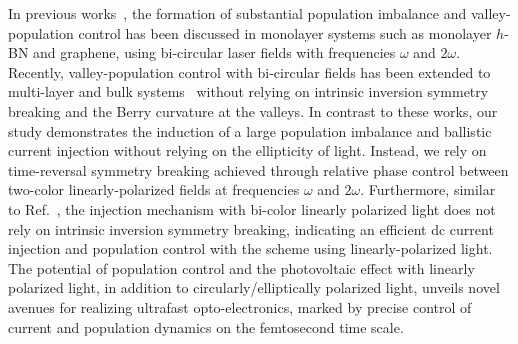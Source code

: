In previous works~\cite{PhysRevLett.127.126601, sato2019microscopic}, the formation of substantial population imbalance and valley-population control has been discussed in monolayer systems such as monolayer $h$-BN and graphene, using bi-circular laser fields with frequencies $\omega$ and $2\omega$. Recently, valley-population control with bi-circular fields has been extended to multi-layer and bulk systems~\cite{tyulnev2023valleytronics} without relying on intrinsic inversion symmetry breaking and the Berry curvature at the valleys. In contrast to these works, our study demonstrates the induction of a large population imbalance and ballistic current injection without relying on the ellipticity of light. Instead, we rely on time-reversal symmetry breaking achieved through relative phase control between two-color linearly-polarized fields at frequencies $\omega$ and $2\omega$. Furthermore, similar to Ref.~\cite{tyulnev2023valleytronics}, the injection mechanism with bi-color linearly polarized light does not rely on intrinsic inversion symmetry breaking, indicating an efficient dc current injection and population control with the scheme using linearly-polarized light. The potential of population control and the photovoltaic effect with linearly polarized light, in addition to circularly/elliptically polarized light, unveils novel avenues for realizing ultrafast opto-electronics, marked by precise control of current and population dynamics on the femtosecond time scale.

